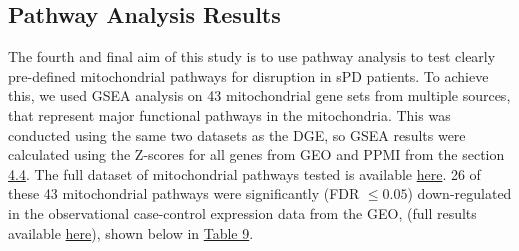 \documentclass{article}
\begin{document}
\subsection{Pathway Analysis Results}
The fourth and final aim of this study is to use pathway analysis to test clearly pre-defined mitochondrial pathways for disruption in sPD patients. To achieve this, we used GSEA analysis on 43 mitochondrial gene sets from multiple sources, that represent major functional pathways in the mitochondria. This was conducted using the same two datasets as the DGE, so GSEA results were calculated using the Z-scores for all genes from GEO and PPMI from the section \hyperref[subsec:DGE]{4.4}. The full dataset of mitochondrial pathways tested is available \href{https://github.com/Thomas-brightwell/PD-MSc-project-code/blob/main/Thesis/Supplementary%20materials/mito43.gmt}{here}. 26 of these 43 mitochondrial pathways were significantly (FDR $\leq0.05$) down-regulated in the observational case-control expression data from the GEO, (full results available
\href{https://github.com/Thomas-brightwell/PD-MSc-project-code/blob/main/Thesis/Supplementary%20materials/GEO_gsea_results.csv}{here}), shown below in \hyperref[tab:pathways]{Table 9}.
\newpage
\end{document}
